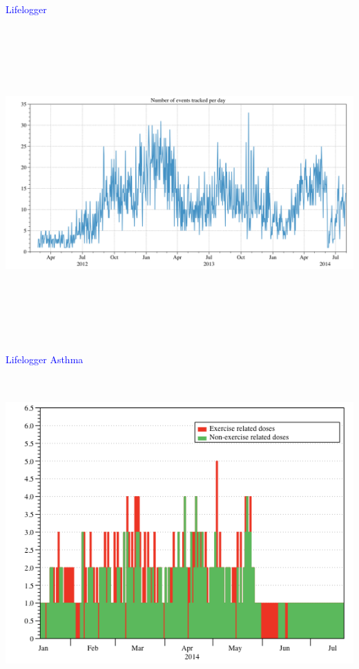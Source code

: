 \documentclass[landscape]{slides}
\begin{document}
\begin{slide}

    \textcolor{blue}{\Large{Lifelogger}}

    \begin{center}
        \includegraphics[height=12cm]{lifelog-number-per-day}
    \end{center}

\end{slide}



\begin{slide}

    \textcolor{blue}{\Large{Lifelogger Asthma}}

    \begin{center}
        \includegraphics[height=12cm]{lifelog-inhalers}
    \end{center}

\end{slide}
\end{document}
